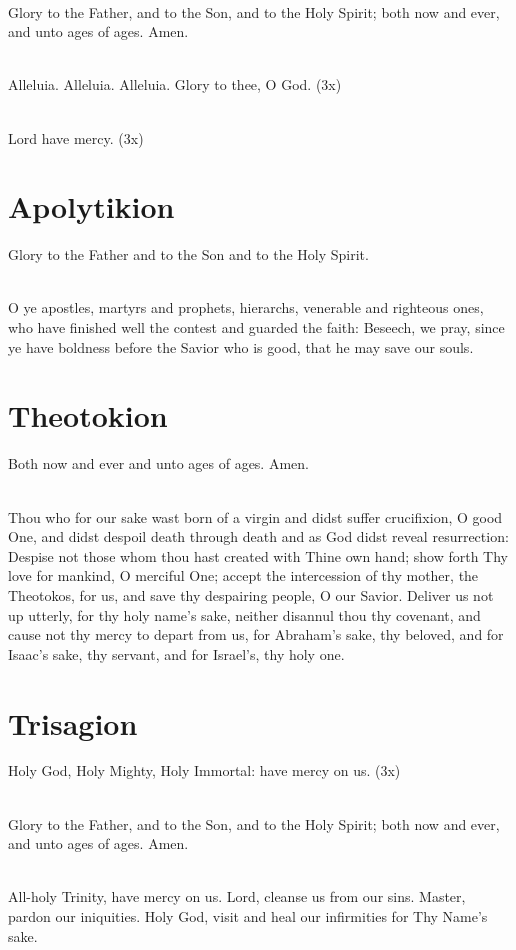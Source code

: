 {\mbox{}\\
Glory to the Father, and to the Son, and to the Holy Spirit;
both now and ever, 
and unto ages of ages. Amen.

\mbox{}\\
Alleluia. Alleluia. Alleluia. Glory to thee, O God. (3x)

\mbox{}\\
Lord have mercy. (3x)

\section*{Apolytikion}
Glory to the Father and to the Son and to the Holy Spirit.

\mbox{}\\ 
O ye apostles, martyrs and prophets, hierarchs,
venerable and righteous ones, who have 
finished well the contest and guarded the faith:
Beseech, we pray, since ye have boldness 
before the Savior who is good, that he may save our souls.
 
\section*{Theotokion}
Both now and ever and unto ages of ages. Amen.

\mbox{}\\
Thou who for our sake wast born of a virgin and didst suffer crucifixion,
O good One, 
and didst despoil death through death and as God didst reveal resurrection:
Despise not those whom thou hast created with Thine own hand;
show forth Thy love for mankind,
O merciful One; accept the intercession of thy mother, the Theotokos,
for us, and save thy despairing people, O our Savior.
Deliver us not up utterly, for thy holy name’s sake,
neither disannul thou thy covenant, 
and cause not thy mercy to depart from us, for Abraham’s sake, thy beloved, and for Isaac’s sake, thy servant, and for Israel’s, thy holy one. 

\section*{Trisagion}
Holy God, Holy Mighty, Holy Immortal: have mercy on us. (3x)

\mbox{}\\
Glory to the Father, and to the Son, and to the Holy Spirit;
both now and ever, 
and unto ages of ages. Amen.

\mbox{}\\
All-holy Trinity, have mercy on us. Lord, cleanse us from our sins. Master, 
pardon our iniquities.
Holy God, visit and heal our infirmities for Thy Name’s sake. 

}
